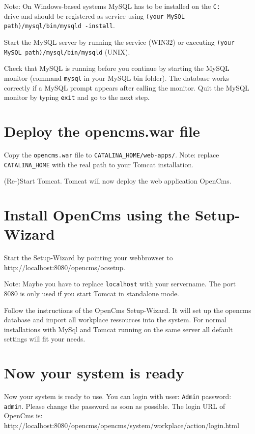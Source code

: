 Note: On Windows-based systems MySQL has to be installed on the
\texttt{C:\\} drive and should be registered as service using
\texttt{(your MySQL path)/mysql/bin/mysqld -install}.

Start the MySQL server by running the service (WIN32) or executing
\texttt{(your MySQL path)/mysql/bin/mysqld} (UNIX).

Check that MySQL is running before you continue by starting the
MySQL monitor (command \texttt{mysql} in your MySQL bin folder).
The database works correctly if a MySQL prompt appears after
calling the monitor. Quit the MySQL monitor by typing
\texttt{exit} and go to the next step.

\section{Deploy the opencms.war file}
Copy the \texttt{opencms.war} file to
\texttt{CATALINA\_HOME/web-apps/}. Note: replace
\texttt{CATALINA\_HOME} with the real path to your Tomcat
installation.

(Re-)Start Tomcat. Tomcat will now deploy the web application
OpenCms.

\section{Install OpenCms using the Setup-Wizard}
Start the Setup-Wizard by pointing your webbrowser to\\
    {http://localhost:8080/opencms/ocsetup}.

Note: Maybe you have to replace \texttt{localhost} with your
servername. The port 8080 is only used if you start Tomcat in
standalone mode.

Follow the instructions of the OpenCms Setup-Wizard. It will set
up the opencms database and import all workplace ressources into
the system. For normal installations with MySql and Tomcat running
on the same server all default settings will fit your needs.

\section{Now your system is ready}
Now your system is ready to use. You can login with user:
\texttt{Admin} password: \texttt{admin}. Please change the
password as soon as possible. The login URL of OpenCms is:\\
{http://localhost:8080/opencms/opencms/system/workplace/action/login.html}

